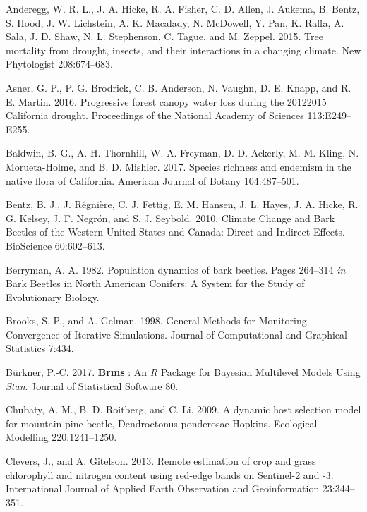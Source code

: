 \documentclass[]{article}
\begin{document}
\hypertarget{refs}{}
\hypertarget{ref-anderegg2015a}{}
Anderegg, W. R. L., J. A. Hicke, R. A. Fisher, C. D. Allen, J. Aukema,
B. Bentz, S. Hood, J. W. Lichstein, A. K. Macalady, N. McDowell, Y. Pan,
K. Raffa, A. Sala, J. D. Shaw, N. L. Stephenson, C. Tague, and M.
Zeppel. 2015. Tree mortality from drought, insects, and their
interactions in a changing climate. New Phytologist 208:674--683.

\hypertarget{ref-asner2016}{}
Asner, G. P., P. G. Brodrick, C. B. Anderson, N. Vaughn, D. E. Knapp,
and R. E. Martin. 2016. Progressive forest canopy water loss during the
20122015 California drought. Proceedings of the National Academy of
Sciences 113:E249--E255.

\hypertarget{ref-baldwin2017a}{}
Baldwin, B. G., A. H. Thornhill, W. A. Freyman, D. D. Ackerly, M. M.
Kling, N. Morueta-Holme, and B. D. Mishler. 2017. Species richness and
endemism in the native flora of California. American Journal of Botany
104:487--501.

\hypertarget{ref-bentz2010}{}
Bentz, B. J., J. Régnière, C. J. Fettig, E. M. Hansen, J. L. Hayes, J.
A. Hicke, R. G. Kelsey, J. F. Negrón, and S. J. Seybold. 2010. Climate
Change and Bark Beetles of the Western United States and Canada: Direct
and Indirect Effects. BioScience 60:602--613.

\hypertarget{ref-berryman1982}{}
Berryman, A. A. 1982. Population dynamics of bark beetles. Pages
264--314 \emph{in} Bark Beetles in North American Conifers: A System for
the Study of Evolutionary Biology.

\hypertarget{ref-brooks1998}{}
Brooks, S. P., and A. Gelman. 1998. General Methods for Monitoring
Convergence of Iterative Simulations. Journal of Computational and
Graphical Statistics 7:434.

\hypertarget{ref-burkner2017}{}
Bürkner, P.-C. 2017. \textbf{Brms} : An \emph{R} Package for Bayesian
Multilevel Models Using \emph{Stan}. Journal of Statistical Software 80.

\hypertarget{ref-chubaty2009}{}
Chubaty, A. M., B. D. Roitberg, and C. Li. 2009. A dynamic host
selection model for mountain pine beetle, Dendroctonus ponderosae
Hopkins. Ecological Modelling 220:1241--1250.

\hypertarget{ref-clevers2013}{}
Clevers, J., and A. Gitelson. 2013. Remote estimation of crop and grass
chlorophyll and nitrogen content using red-edge bands on Sentinel-2 and
-3. International Journal of Applied Earth Observation and
Geoinformation 23:344--351.
\end{document}
